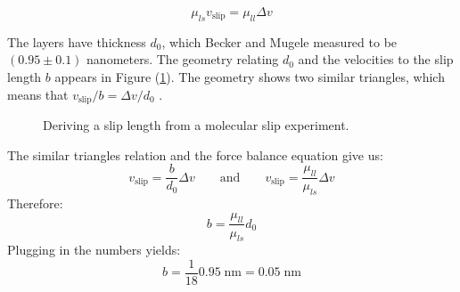 \documentclass[12pt, a4paper, twoside, openright]{book}
\newcommand{\vslip}{\ensuremath{v_{\mathrm{slip}}}}
\begin{document}
\begin{equation}
\mu_{ls} v_{\mathrm{slip}} = \mu_{ll} \Delta v
\end{equation}

The layers have thickness $d_0$, which Becker and Mugele measured to be $(0.95 \pm 0.1)$ nanometers.  The geometry relating $d_0$ and the velocities to the slip length $b$ appears in Figure (\ref{B&M}).  The geometry shows two similar triangles, which means that $\vslip / b = \Delta v / d_0  $ .


\begin{figure}[ht!]
\centering
{}
\caption{Deriving a slip length from a molecular slip experiment.} \label{B&M}
\end{figure}

The similar triangles relation and the force balance equation give us:
\begin{equation}
v_{\mathrm{slip}} = \frac{b}{d_0} \Delta v
\qquad \text{and} \qquad
v_{\mathrm{slip}} = \frac{\mu_{ll}}{\mu_{ls}} \Delta v
\end{equation}
Therefore:
\begin{equation}
b = \frac{\mu_{ll}}{\mu_{ls}} d_0
\end{equation}
Plugging in the numbers yields:
\begin{equation}
b = \frac{1}{18} 0.95 \; \text{nm} = 0.05 \; \text{nm}
\end{equation}
\end{document}
